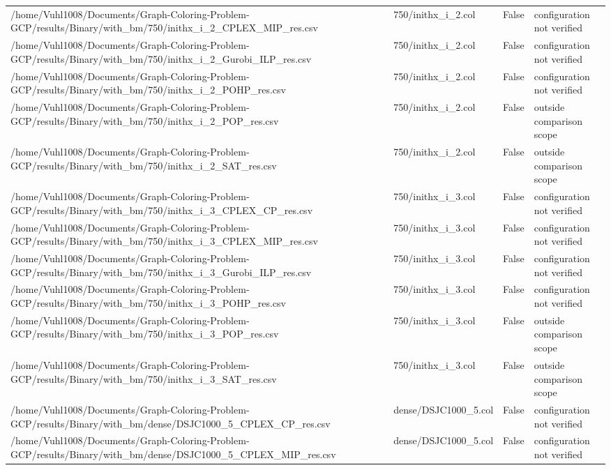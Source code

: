 \begin{table}[htbp]
\begin{tabular}{llll}
/home/Vuhl1008/Documents/Graph-Coloring-Problem-GCP/results/Binary/with\_bm/750/inithx\_i\_2\_CPLEX\_MIP\_res.csv & 750/inithx\_i\_2.col & False & configuration not verified \\
/home/Vuhl1008/Documents/Graph-Coloring-Problem-GCP/results/Binary/with\_bm/750/inithx\_i\_2\_Gurobi\_ILP\_res.csv & 750/inithx\_i\_2.col & False & configuration not verified \\
/home/Vuhl1008/Documents/Graph-Coloring-Problem-GCP/results/Binary/with\_bm/750/inithx\_i\_2\_POHP\_res.csv & 750/inithx\_i\_2.col & False & configuration not verified \\
/home/Vuhl1008/Documents/Graph-Coloring-Problem-GCP/results/Binary/with\_bm/750/inithx\_i\_2\_POP\_res.csv & 750/inithx\_i\_2.col & False & outside comparison scope \\
/home/Vuhl1008/Documents/Graph-Coloring-Problem-GCP/results/Binary/with\_bm/750/inithx\_i\_2\_SAT\_res.csv & 750/inithx\_i\_2.col & False & outside comparison scope \\
/home/Vuhl1008/Documents/Graph-Coloring-Problem-GCP/results/Binary/with\_bm/750/inithx\_i\_3\_CPLEX\_CP\_res.csv & 750/inithx\_i\_3.col & False & configuration not verified \\
/home/Vuhl1008/Documents/Graph-Coloring-Problem-GCP/results/Binary/with\_bm/750/inithx\_i\_3\_CPLEX\_MIP\_res.csv & 750/inithx\_i\_3.col & False & configuration not verified \\
/home/Vuhl1008/Documents/Graph-Coloring-Problem-GCP/results/Binary/with\_bm/750/inithx\_i\_3\_Gurobi\_ILP\_res.csv & 750/inithx\_i\_3.col & False & configuration not verified \\
/home/Vuhl1008/Documents/Graph-Coloring-Problem-GCP/results/Binary/with\_bm/750/inithx\_i\_3\_POHP\_res.csv & 750/inithx\_i\_3.col & False & configuration not verified \\
/home/Vuhl1008/Documents/Graph-Coloring-Problem-GCP/results/Binary/with\_bm/750/inithx\_i\_3\_POP\_res.csv & 750/inithx\_i\_3.col & False & outside comparison scope \\
/home/Vuhl1008/Documents/Graph-Coloring-Problem-GCP/results/Binary/with\_bm/750/inithx\_i\_3\_SAT\_res.csv & 750/inithx\_i\_3.col & False & outside comparison scope \\
/home/Vuhl1008/Documents/Graph-Coloring-Problem-GCP/results/Binary/with\_bm/dense/DSJC1000\_5\_CPLEX\_CP\_res.csv & dense/DSJC1000\_5.col & False & configuration not verified \\
/home/Vuhl1008/Documents/Graph-Coloring-Problem-GCP/results/Binary/with\_bm/dense/DSJC1000\_5\_CPLEX\_MIP\_res.csv & dense/DSJC1000\_5.col & False & configuration not verified \\

\end{tabular}
\end{table}
